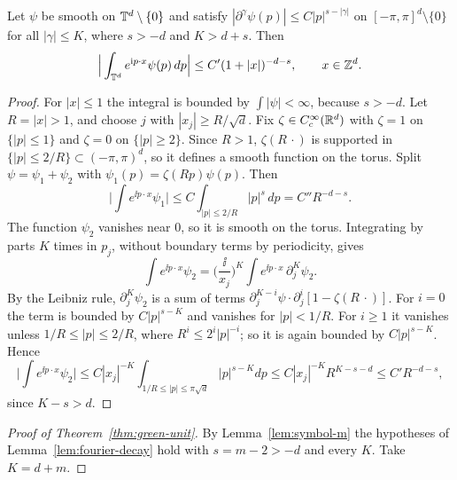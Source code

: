 \begin{lemma}\label{lem:fourier-decay}
Let $\psi$ be smooth on $\mathbb T^d\setminus\{0\}$ and satisfy $|\partial^\gamma \psi(p)|\le C|p|^{s-|\gamma|}$ on $[-\pi,\pi]^d\setminus\{0\}$ for all $|\gamma|\le K$, where $s>-d$ and $K>d+s$. Then
\[
\Big|\int_{\mathbb T^d}e^{\mathrm i p\cdot x}\psi(p)\,dp\Big|\le C'(1+|x|)^{-d-s},\qquad x\in\mathbb Z^d .
\]
\end{lemma}

\begin{proof}
For $|x|\le1$ the integral is bounded by $\int|\psi|<\infty$, because $s>-d$. Let $R=|x|>1$, and choose $j$ with $|x_j|\ge R/\sqrt d$. Fix $\zeta\in C_c^\infty(\mathbb R^d)$ with $\zeta=1$ on $\{|p|\le1\}$ and $\zeta=0$ on $\{|p|\ge2\}$. Since $R>1$, $\zeta(R\,\cdot)$ is supported in $\{|p|\le2/R\}\subset(-\pi,\pi)^d$, so it defines a smooth function on the torus. Split $\psi=\psi_1+\psi_2$ with $\psi_1(p)=\zeta(Rp)\psi(p)$. Then
\[
\Big|\int e^{\ii p\cdot x}\psi_1\Big|\le C\int_{|p|\le2/R}|p|^s\,dp=C''R^{-d-s}.
\]
The function $\psi_2$ vanishes near $0$, so it is smooth on the torus. Integrating by parts $K$ times in $p_j$, without boundary terms by periodicity, gives
\[
\int e^{\ii p\cdot x}\psi_2=\Big(\frac{\ii}{x_j}\Big)^K\int e^{\ii p\cdot x}\,\partial_j^K\psi_2 .
\]
By the Leibniz rule, $\partial_j^K\psi_2$ is a sum of terms $\partial_j^{K-i}\psi\cdot\partial_j^i[1-\zeta(R\,\cdot)]$. For $i=0$ the term is bounded by $C|p|^{s-K}$ and vanishes for $|p|<1/R$. For $i\ge1$ it vanishes unless $1/R\le|p|\le2/R$, where $R^i\le2^i|p|^{-i}$; so it is again bounded by $C|p|^{s-K}$. Hence
\[
\Big|\int e^{\ii p\cdot x}\psi_2\Big|\le C|x_j|^{-K}\int_{1/R\le|p|\le\pi\sqrt d}|p|^{s-K}dp\le C|x_j|^{-K}R^{K-s-d}\le C'R^{-d-s},
\]
since $K-s>d$.
\end{proof}

\begin{proof}[Proof of Theorem~\ref{thm:green-unit}]
By Lemma~\ref{lem:symbol-m} the hypotheses of Lemma~\ref{lem:fourier-decay} hold with $s=m-2>-d$ and every $K$. Take $K=d+m$.
\end{proof}
